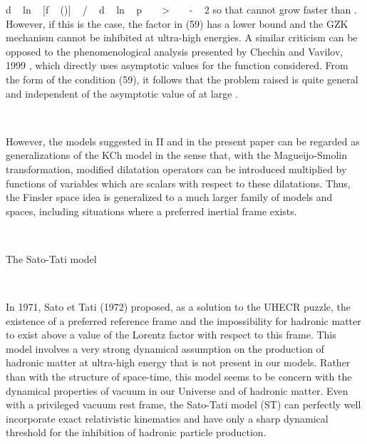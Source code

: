 \documentclass[a4paper,12pt,dvips]{article}
\makeatletter
\renewcommand{\section}{\@startsection{section}{1}{0in}
	{0.4\baselineskip}{0.1\baselineskip}{\Large\bf}}
\makeatother
\begin{document}
\equation 
d ~ ln ~ [f ~ (\xi )] ~ / ~ d ~ ln ~ p ~ ~ > ~ ~ - ~ 2
\endequation
\noindent
so that \coordHE{} cannot grow faster than \coordHE{}. However, if this is the case, the factor \coordHE{} in (59) has a lower bound and the GZK mechanism cannot be inhibited at ultra-high energies. A similar criticism can be opposed to the phenomenological analysis presented by Chechin and Vavilov, 1999 , which directly uses asymptotic values for the \coordHE{} function considered. From the form of the condition (59), it follows that the problem raised is quite general and independent of the asymptotic value of \coordHE{} at large \myHighlight{$\xi $}\coordHE{} .

~ 

However, the models suggested in II and in the present paper can be regarded as generalizations of the KCh model in the sense that, with the Magueijo-Smolin transformation, modified dilatation operators can be introduced multiplied by functions of variables which are scalars with respect to these dilatations. Thus, the Finsler space idea is generalized to a much larger family of models and spaces, including situations where a preferred inertial frame exists.

~ 
~ 

\section{The Sato-Tati model}
\label{satotati.sec}

~ 

In 1971, Sato et Tati (1972) proposed, as a solution to the UHECR puzzle, the existence of a preferred reference frame and the impossibility for hadronic matter to exist above a value of the Lorentz factor \coordHE{} with respect to this frame. This model involves a very strong dynamical assumption on the production of hadronic matter at ultra-high energy that is not present in our models. Rather than with the structure of space-time, this model seems to be concern with the dynamical properties of vacuum in our Universe and of hadronic matter. Even with a privileged vacuum rest frame, the Sato-Tati model (ST) can perfectly well incorporate exact relativistic kinematics and have only a sharp dynamical threshold for the inhibition of hadronic particle production.

~ 
\end{document}
